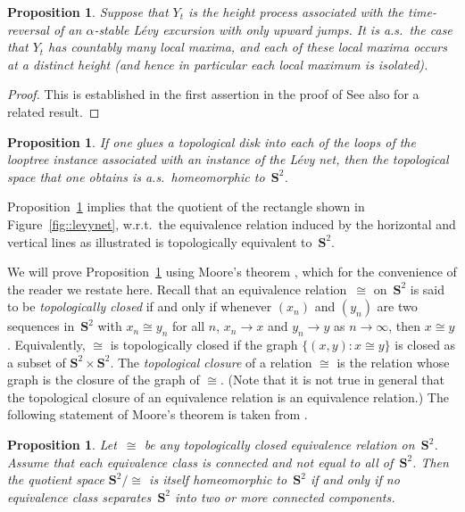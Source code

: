 \documentclass[10pt]{amsart}
\theoremstyle{plain}
\numberwithin{theorem}{section}
\newtheorem{proposition}[theorem]{Proposition}
\theoremstyle{definition}
\renewcommand{\S}{{\mathbf S}}
\begin{document}
\begin{proposition}
\label{prop::noisolatedmax}
Suppose that $Y_t$ is the height process associated with the time-reversal of an $\alpha$-stable Lévy excursion with only upward jumps. It is a.s.\ the case that $Y_t$ has countably many local maxima, and each of these local maxima occurs at a distinct height (and hence in particular each local maximum is isolated).
\end{proposition}
\begin{proof}
This is established in the first assertion in the proof of \cite[Th.\,4.4]{duquesnelegall2005levytrees}
See also \cite[Lem.\,2.5.3]{dlg2002trees_levy} for a related result.
\end{proof}

\begin{proposition}
\label{prop::spherelevynet}
If one glues a topological disk into each of the loops of the looptree instance associated with an instance of the Lévy net, then the topological space that one obtains is a.s.\ homeomorphic to~$\S^2$.
\end{proposition}

Proposition~\ref{prop::spherelevynet} implies that the quotient of the rectangle shown in Figure~\ref{fig::levynet}, w.r.t.\ the equivalence relation induced by the horizontal and vertical lines as illustrated is topologically equivalent to~$\S^2$.

We will prove Proposition~\ref{prop::spherelevynet} using Moore's theorem \cite{moore1925concerning}, which for the convenience of the reader we restate here. Recall that an equivalence relation~$\cong$ on~$\S^2$ is said to be \emph{topologically closed} if and only if whenever $(x_n)$ and $(y_n)$ are two sequences in~$\S^2$ with $x_n \cong y_n$ for all $n$, $x_n \to x$ and $y_n \to y$ as $n \to \infty$, then $x \cong y$. Equivalently, $\cong$ is topologically closed if the graph $\{(x,y): x \cong y \}$ is closed as a subset of $\S^2 \times \S^2$. The \emph{topological closure} of a relation $\cong$ is the relation whose graph is the closure of the graph of $\cong$. (Note that it is not true in general that the topological closure of an equivalence relation is an equivalence relation.) The following statement of Moore's theorem is taken from \cite{milnor2004pasting}.

\begin{proposition}
\label{prop::moore}
Let~$\cong$ be any topologically closed equivalence relation on~$\S^2$. Assume that each equivalence class is connected and not equal to all of~$\S^2$. Then the quotient space $\S^2 / \cong$ is itself homeomorphic to~$\S^2$ if and only if no equivalence class separates~$\S^2$ into two or more connected components.
\end{proposition}
\end{document}
